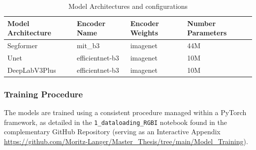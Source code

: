 \documentclass{report}
\begin{document}
\begin{table}[H]
\centering
\caption{Model Architectures and configurations}
\label{tab:model_architectures}
\begin{tabular}{llll}
\toprule
Model Architecture & Encoder Name & Encoder Weights & Number Parameters \\
\midrule
Segformer & mit\_b3 & imagenet & 44M \\
Unet & efficientnet-b3 & imagenet & 10M \\
DeepLabV3Plus & efficientnet-b3 & imagenet & 10M \\
\bottomrule
\end{tabular}

\end{table}

\subsubsection{Training Procedure}
\label{sec:training_procedure}
The models are trained using a consistent procedure managed within a PyTorch framework, as detailed in the \texttt{1\_dataloading\_RGBI} notebook found in the complementary GitHub Repository (serving as an Interactive Appendix \url{https://github.com/Moritz-Langer/Master_Thesis/tree/main/Model_Training}).
\end{document}
